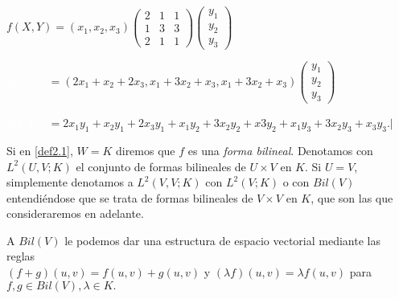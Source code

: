 			$f(X,Y) = (x_{1}, x_{2}, x_{3})\left(\begin{matrix}
			2 & 1 & 1 \\ 1 & 3 & 3 \\ 2 & 1 & 1 
			\end{matrix}\right)\left(\begin{matrix}
				y_{1} \\ y_{2} \\ y_{3}
			\end{matrix}\right)	
			$
			
			 \textcolor{white}{\textit{f(X,Y)=}}$=(2x_{1} + x_{2} + 2x_{3}, x_{1} + 3x_{2} + x_{3}, x_{1} + 3x_{2} + x_{3})\left(\begin{matrix}
			 y_{1} \\ y_{2} \\ y_{3}
			 \end{matrix}\right)
			$
		
			\textcolor{white}{\textit{f(X,Y)=}}$ =2x_{1}y_{1} + x_{2}y_{1} + 2x_{3}y_{1} + x_{1}y_{2} + 3x_{2}y_{2} + x3y_{2} + x_{1}y_{3} + 3x_{2}y_{3} + x_{3}y_{3}.| $
			
			Si en \ref{def2.1}, $ W = K $ diremos que $ f $ es una \textit{forma bilineal}. Denotamos con $ L^{2}(U, V ;K) $ el conjunto de formas bilineales de $ U \times V $ en $ K $. Si $ U = V $, simplemente denotamos a $ L^{2}(V, V ;K) $ con $ L^{2}(V ;K) $ o con $ Bil(V) $ entendiéndose que
			se trata de formas bilineales de $ V \times V $ en $ K $, que son las que consideraremos en adelante.
			
			A $ Bil(V) $ le podemos dar una estructura de espacio vectorial mediante las reglas \\
		$ (f+g)(u,v) = f(u,v) + g(u,v) $ y $(\lambda f)(u,v) = \lambda f(u, v)$ para $f, g \in Bil(V), \lambda \in K. $